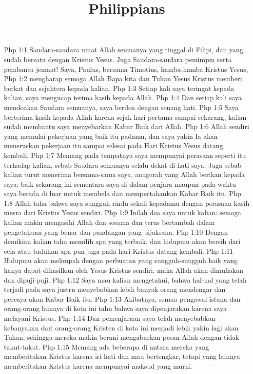 

\title{Philippians}

Php 1:1  Saudara-saudara umat Allah semuanya yang tinggal di Filipi, dan yang sudah bersatu dengan Kristus Yesus. Juga Saudara-saudara pemimpin serta pembantu jemaat! Saya, Paulus, bersama Timotius, hamba-hamba Kristus Yesus,
Php 1:2  mengharap semoga Allah Bapa kita dan Tuhan Yesus Kristus memberi berkat dan sejahtera kepada kalian.
Php 1:3  Setiap kali saya teringat kepada kalian, saya mengucap terima kasih kepada Allah.
Php 1:4  Dan setiap kali saya mendoakan Saudara semuanya, saya berdoa dengan senang hati.
Php 1:5  Saya berterima kasih kepada Allah karena sejak hari pertama sampai sekarang, kalian sudah membantu saya menyebarkan Kabar Baik dari Allah.
Php 1:6  Allah sendiri yang memulai pekerjaan yang baik itu padamu, dan saya yakin Ia akan meneruskan pekerjaan itu sampai selesai pada Hari Kristus Yesus datang kembali.
Php 1:7  Memang pada tempatnya saya mempunyai perasaan seperti itu terhadap kalian, sebab Saudara semuanya selalu dekat di hati saya. Juga sebab kalian turut menerima bersama-sama saya, anugerah yang Allah berikan kepada saya; baik sekarang ini sementara saya di dalam penjara maupun pada waktu saya berada di luar untuk membela dan mempertahankan Kabar Baik itu.
Php 1:8  Allah tahu bahwa saya sungguh rindu sekali kepadamu dengan perasaan kasih mesra dari Kristus Yesus sendiri.
Php 1:9  Inilah doa saya untuk kalian: semoga kalian makin mengasihi Allah dan sesama dan terus bertambah dalam pengetahuan yang benar dan pandangan yang bijaksana.
Php 1:10  Dengan demikian kalian tahu memilih apa yang terbaik, dan hidupmu akan bersih dari cela atau tuduhan apa pun juga pada hari Kristus datang kembali.
Php 1:11  Hidupmu akan melimpah dengan perbuatan yang sungguh-sungguh baik yang hanya dapat dihasilkan oleh Yesus Kristus sendiri; maka Allah akan dimuliakan dan dipuji-puji.
Php 1:12  Saya mau kalian mengetahui, bahwa hal-hal yang telah terjadi pada saya justru menyebabkan lebih banyak orang mendengar dan percaya akan Kabar Baik itu.
Php 1:13  Akibatnya, semua pengawal istana dan orang-orang lainnya di kota ini tahu bahwa saya dipenjarakan karena saya melayani Kristus.
Php 1:14  Dan pemenjaraan saya telah menyebabkan kebanyakan dari orang-orang Kristen di kota ini menjadi lebih yakin lagi akan Tuhan, sehingga mereka makin berani mengabarkan pesan Allah dengan tidak takut-takut.
Php 1:15  Memang ada beberapa di antara mereka yang memberitakan Kristus karena iri hati dan mau bertengkar, tetapi yang lainnya memberitakan Kristus karena mempunyai maksud yang murni.
